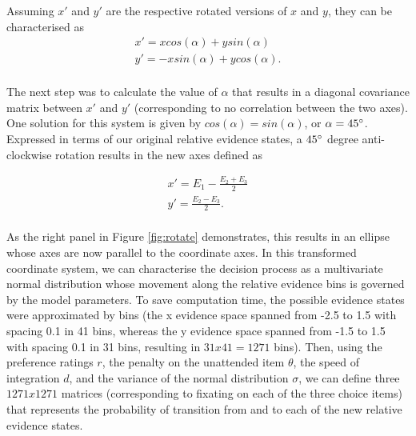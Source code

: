 \documentclass[11pt,a4paper]{article}
\begin{document}
Assuming $x'$ and $y'$ are the respective rotated versions of $x$ and $y$, they can be characterised as
\begin{equation}
\begin{array}{l}
\displaystyle x' = x cos(\alpha) + y sin(\alpha)\\
\displaystyle y' = -x sin(\alpha) + y cos(\alpha).\\
\end{array} 
\label{eq:axes2}
\end{equation}

The next step was to calculate the value of $\alpha$ that results in a diagonal covariance matrix between $x'$ and $y'$ (corresponding to no correlation between the two axes). One solution for this system is given by $cos(\alpha) = sin(\alpha)$, or $\alpha = 45\degree$. Expressed in terms of our original relative evidence states, a $45\degree$ degree anti-clockwise rotation results in the new axes defined as

\begin{equation}
\begin{array}{l}
\displaystyle x' = E_{1}-\frac{E_{2}+E_{3}}{2}\\
\displaystyle y' = \frac{E_{2}-E_{3}}{2}.\\
\end{array} 
\label{eq:axes1}
\end{equation}
 
As the right panel in Figure \ref{fig:rotate} demonstrates, this results in an ellipse whose axes are now parallel to the coordinate axes. In this transformed coordinate system, we can characterise the decision process as a multivariate normal distribution whose movement along the relative evidence bins is governed by the model parameters. To save computation time, the possible evidence states were approximated by bins (the x evidence space spanned from -2.5 to 1.5 with spacing 0.1 in 41 bins, whereas the y evidence space spanned from -1.5 to 1.5 with spacing 0.1 in 31 bins, resulting in $31x41 = 1271$ bins). Then, using the preference ratings $r$, the penalty on the unattended item $\theta$, the speed of integration $d$, and the variance of the normal distribution $\sigma$, we can define three $1271x1271$ matrices (corresponding to fixating on each of the three choice items) that represents the probability of transition from and to each of the new relative evidence states. 
\end{document}
